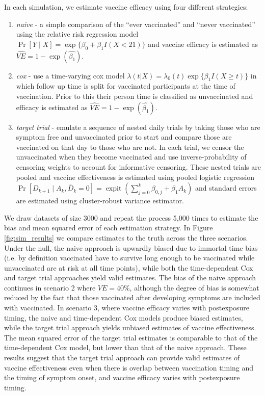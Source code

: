 \documentclass[11pt]{article}
\begin{document}
In each simulation, we estimate vaccine efficacy using four different strategies:
\begin{enumerate}
    \item \textit{naive} - a simple comparison of the ``ever vaccinated'' and ``never vaccinated'' using the relative risk regression model $\Pr[Y \mid X] = \operatorname{exp}\{\beta_0 + \beta_1 I(X < 21)\}$ and vaccine efficacy is estimated as $\widehat{VE} = 1 - \exp(\widehat{\beta_1})$.
    \item \textit{cox} - use a time-varying cox model $\lambda(t|X) = \lambda_0(t) \exp\{\beta_1 I(X \geq t)\}$ in which follow up time is split for vaccinated participants at the time of vaccination. Prior to this their person time is classified as unvaccinated and efficacy is estimated as $\widehat{VE} = 1 - \exp(\widehat{\beta_1})$.
    \item \textit{target trial} - emulate a sequence of nested daily trials by taking those who are symptom free and unvaccinated prior to start and compare those are vaccinated on that day to those who are not. In each trial, we censor the unvaccinated when they become vaccinated and use inverse-probability of censoring weights to account for informative censoring. These nested trials are pooled and vaccine effectiveness is estimated using pooled logistic regression $\Pr[D_{k+1} \mid A_k, \overline{D}_{k} = 0] = \operatorname{expit}(\sum_{j=0}^k \beta_{0, j} + \beta_1 A_k)$ and standard errors are estimated using cluster-robust variance estimator.
\end{enumerate}

We draw datasets of size 3000 and repeat the process 5,000 times to estimate the bias and mean squared error of each estimation strategy. In Figure \ref{fig:sim_results} we compare estimates to the truth across the three scenarios. Under the null, the naive approach is upwardly biased due to immortal time bias (i.e. by definition vaccinated have to survive long enough to be vaccinated while unvaccinated are at risk at all time points), while both the time-dependent Cox and target trial approaches yield valid estimates. The bias of the naive approach continues in scenario 2 where $VE = 40\%$, although the degree of bias is somewhat reduced by the fact that those vaccinated after developing symptoms are included with vaccinated. In scenario 3, where vaccine efficacy varies with postexposure timing, the naive and time-dependent Cox models produce biased estimates, while the target trial approach yields unbiased estimates of vaccine effectiveness. The mean squared error of the target trial estimates is comparable to that of the time-dependent Cox model, but lower than that of the naive approach. These results suggest that the target trial approach can provide valid estimates of vaccine effectiveness even when there is overlap between vaccination timing and the timing of symptom onset, and vaccine efficacy varies with postexposure timing.
\end{document}
